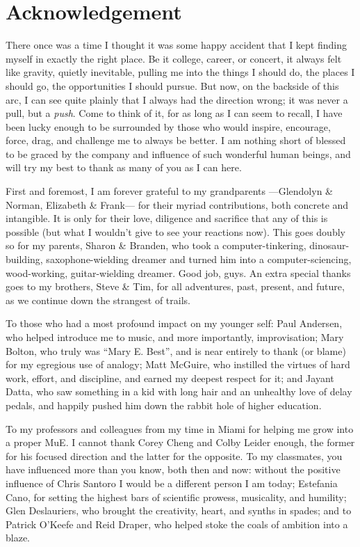 
\chapter*{Acknowledgement}

There once was a time I thought it was some happy accident that I kept finding myself in exactly the right place.
Be it college, career, or concert, it always felt like gravity, quietly inevitable, pulling me into the things I should do, the places I should go, the opportunities I should pursue.
But now, on the backside of this arc, I can see quite plainly that I always had the direction wrong; it was never a pull, but a \emph{push}.
Come to think of it, for as long as I can seem to recall, I have been lucky enough to be surrounded by those who would inspire, encourage, force, drag, and challenge me to always be better.
I am nothing short of blessed to be graced by the company and influence of such wonderful human beings, and will try my best to thank as many of you as I can here.

First and foremost, I am forever grateful to my grandparents ---Glendolyn \& Norman, Elizabeth \& Frank--- for their myriad contributions, both concrete and intangible.
It is only for their love, diligence and sacrifice that any of this is possible (but what I wouldn't give to see your reactions now).
This goes doubly so for my parents, Sharon \& Branden, who took a computer-tinkering, dinosaur-building, saxophone-wielding dreamer and turned him into a computer-sciencing, wood-working, guitar-wielding dreamer.
Good job, guys.
An extra special thanks goes to my brothers, Steve \& Tim, for all adventures, past, present, and future, as we continue down the strangest of trails.

To those who had a most profound impact on my younger self:
Paul Andersen, who helped introduce me to music, and more importantly, improvisation;
Mary Bolton, who truly was ``Mary E. Best'', and is near entirely to thank (or blame) for my egregious use of analogy;
Matt McGuire, who instilled the virtues of hard work, effort, and discipline, and earned my deepest respect for it;
and Jayant Datta, who saw something in a kid with long hair and an unhealthy love of delay pedals, and happily pushed him down the rabbit hole of higher education.

To my professors and colleagues from my time in Miami for helping me grow into a proper MuE.
I cannot thank Corey Cheng and Colby Leider enough, the former for his focused direction and the latter for the opposite.
To my classmates, you have influenced more than you know, both then and now:
without the positive influence of Chris Santoro I would be a different person I am today;
Estefania Cano, for setting the highest bars of scientific prowess, musicality, and humility;
Glen Deslauriers, who brought the creativity, heart, and synths in spades;
and to Patrick O'Keefe and Reid Draper, who helped stoke the coals of ambition into a blaze.

